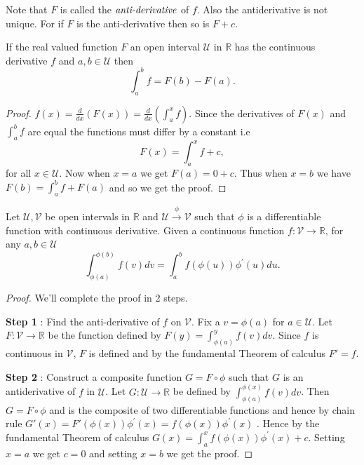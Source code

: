 Note that $F$ is called the $\emph{anti-derivative}$ of $f$. Also the antiderivative is not unique.
For if $F$ is the anti-derivative then so is $F + c$.
\begin{Corollary}
    If the real valued function $F$ an open interval $\mathcal{U}$ in $\mathbb{R}$ has the 
    continuous derivative $f$ and $a,b \in \mathcal{U} $ then
    \[ \int_a^b f = F(b) - F(a) .\]
\end{Corollary}
\begin{proof}
    $f(x) = \frac{d}{dx}(F(x)) = \frac{d}{dx}( \int_a^x f)$. Since the derivatives of $F(x)$ and
    $\int_a^b f$ are equal the functions must differ by a constant i.e 
    \[ F(x) = \int_a^x f + c ,\] for all $x \in \mathcal{U}$. Now when $x = a$ we get $F(a) = 0 +
    c$. Thus when $x = b$ we have $F(b) = \int_a^b f + F(a)$ and so we get the proof. 
\end{proof}
\begin{Corollary}[name=Change of variable Theorem]
Let $\mathcal{U},\mathcal{V}$ be open intervals in $\mathbb{R}$ and 
$\mathcal{U} \stackrel{\phi}{\longrightarrow} \mathcal{V}$ such that $\phi$ is a differentiable
function with continuous derivative. Given a continuous function $f : \mathcal{V} \to \mathbb{R}$, 
for any $a,b \in \mathcal{U}$
\[ \int_{\phi(a)}^{\phi(b)} f(v)dv = \int_a^b f(\phi(u))\phi^{\prime}(u)du .\] 
\end{Corollary}
\begin{proof}
    

    We'll complete the proof in 2 steps.

    \textbf{Step 1} : Find the anti-derivative of $f$ on $\mathcal{V}$.
    Fix a $v = \phi(a)$ for $a \in \mathcal{U}$. Let $F : \mathcal{V} \to \mathbb{R}$ be the
    function defined by $F(y) = \int_{\phi(a)}^y f(v)dv$. Since $f$ is continuous in $\mathcal{V}$,
    $F$ is defined and by the fundamental Theorem of calculus $F' = f$. 

    \textbf{Step 2} : Construct a composite function $G = F \circ \phi$ such that $G$ is an
    antiderivative of $f$ in $\mathcal{U}$.
    Let $G : \mathcal{U} \to \mathbb{R}$ be defined by $\int_{\phi(a)}^{\phi(x)} f(v)dv$. Then $G =
    F \circ \phi$ and is the composite of two differentiable functions and hence by chain rule 
    $G'(x) = F'(\phi(x))\phi^{\prime}(x) = f(\phi(x))\phi^{\prime}(x)$ . 
    Hence by the fundamental Theorem of calculus $G(x) = \int_a^x f(\phi(x))\phi^{\prime}(x) + c$. 
    Setting $x = a$ we get $c = 0$ and setting $ x = b$ we get the proof.

\end{proof}

